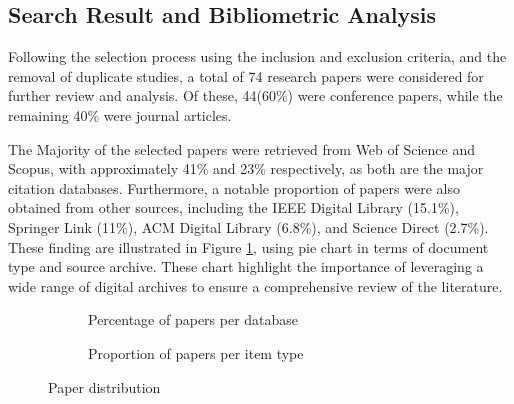 \subsection{Search Result and Bibliometric Analysis}
Following the selection process using the inclusion and exclusion criteria, and the removal of duplicate studies, a total of 74 research papers were considered for further review and analysis. Of these, 44(60\%) were conference papers, while the remaining 40\% were journal articles.

The Majority of the selected papers were retrieved from Web of Science and Scopus, with approximately 41\% and 23\% respectively, as both are the major citation databases. Furthermore, a notable proportion of papers were also obtained from other sources, including the IEEE Digital Library (15.1\%), Springer Link (11\%), ACM Digital Library (6.8\%), and Science Direct (2.7\%). These finding are illustrated in Figure \ref{fig:archive-itemtype}, using pie chart in terms  of document type and source archive. These chart highlight the importance of leveraging a wide range of digital archives to ensure a comprehensive review of the literature. 

% 
% 

\begin{figure}[H]
    \centering
    \begin{subfigure}[b]{0.45\textwidth}
        
        \caption{Percentage of papers per database}
    \end{subfigure}
        \begin{subfigure}[b]{0.45\textwidth}
        
        \caption{Proportion of papers per item type}
    \end{subfigure}
    \caption{Paper distribution}
    \label{fig:archive-itemtype}
\end{figure}


